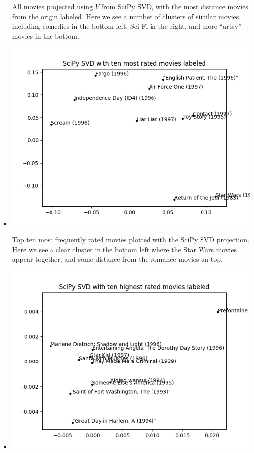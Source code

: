 \begin{itemize}
        All movies projected using $V$ from SciPy SVD, with the most distance movies from the origin labeled. Here we see a number of clusters of similar movies, including comedies in the bottom left, Sci-Fi in the right, and more ``artsy'' movies in the bottom.

    \item {}

        \includegraphics[scale=.5]{scipy_top_ten_frequent.png}

        Top ten most frequently rated movies plotted with the SciPy SVD projection. Here we see a clear cluster in the bottom left where the Star Wars movies appear together, and some distance from the romance movies on top.
    \item {}

        \includegraphics[scale=.5]{scipy_top_ten_rated.png}


\end{itemize}
